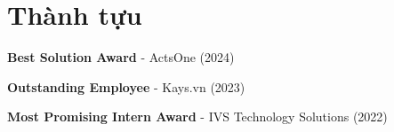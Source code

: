 \section{Thành tựu}
\begin{onecolentry}
    \begin{highlights}
        \item \textbf{Best Solution Award} - ActsOne (2024)
        \item \textbf{Outstanding Employee} - Kays.vn (2023)
        \item \textbf{Most Promising Intern Award} - IVS Technology Solutions (2022)
    \end{highlights}
\end{onecolentry}
